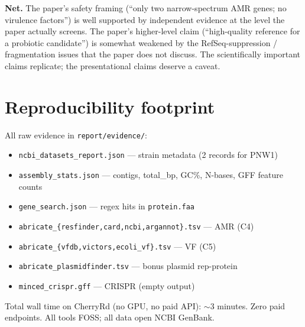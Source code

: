 \documentclass[11pt,letterpaper]{article}
\begin{document}
\noindent \textbf{Net.} The paper's safety framing (``only two narrow-spectrum AMR genes; no virulence factors'') is well supported by independent evidence at the level the paper actually screens. The paper's higher-level claim (``high-quality reference for a probiotic candidate'') is somewhat weakened by the RefSeq-suppression / fragmentation issues that the paper does not discuss. The scientifically important claims replicate; the presentational claims deserve a caveat.

\section{Reproducibility footprint}
All raw evidence in \texttt{report/evidence/}:
\begin{itemize}[leftmargin=1.2em, itemsep=0pt]
  \item \texttt{ncbi\_datasets\_report.json} --- strain metadata (2 records for PNW1)
  \item \texttt{assembly\_stats.json} --- contigs, total\_bp, GC\%, N-bases, GFF feature counts
  \item \texttt{gene\_search.json} --- regex hits in \texttt{protein.faa}
  \item \texttt{abricate\_\{resfinder,card,ncbi,argannot\}.tsv} --- AMR (C4)
  \item \texttt{abricate\_\{vfdb,victors,ecoli\_vf\}.tsv} --- VF (C5)
  \item \texttt{abricate\_plasmidfinder.tsv} --- bonus plasmid rep-protein
  \item \texttt{minced\_crispr.gff} --- CRISPR (empty output)
\end{itemize}

Total wall time on CherryRd (no GPU, no paid API): $\sim$3 minutes. Zero paid endpoints. All tools FOSS; all data open NCBI GenBank.
\end{document}
